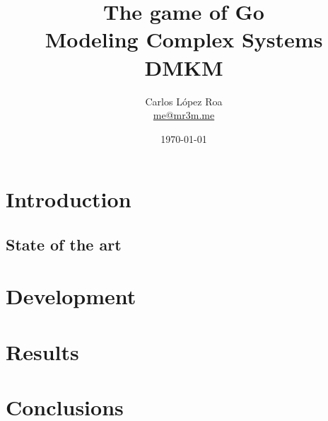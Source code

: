 \documentclass[a4paper,10pt,twocolumn]{article}
\title{The game of Go\\ \small Modeling Complex Systems\\ DMKM}
\author{Carlos López Roa\\ \href{mailto:me@mr3m.me}{me@mr3m.me}}
\date{\today}
\begin{document}
\maketitle
\begin{abstract}

\end{abstract}

\tableofcontents

\section{Introduction}
\subsection{State of the art}

\section{Development}

\section{Results}

\section{Conclusions}






\end{document}
